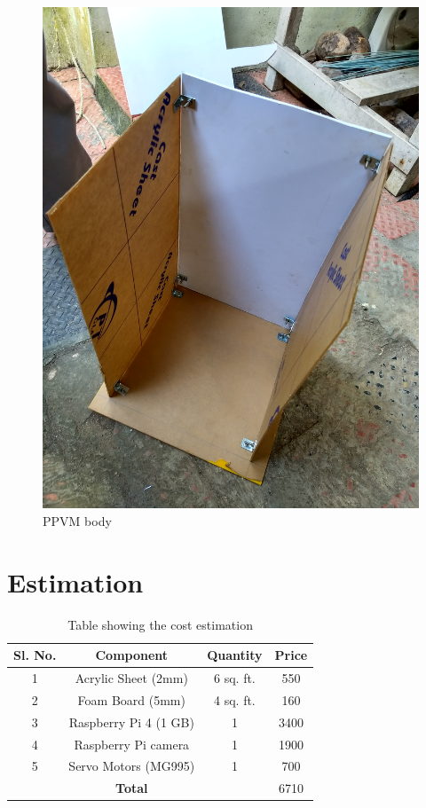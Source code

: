 \begin{figure}[H]
	\centering
	\includegraphics[width=0.7\linewidth]{./picture-files/ppvm_body.jpg}
	\caption{PPVM body}
	\label{fig:ppvm_body}
\end{figure}


\section{Estimation}

\begin{table}[H] \caption{Table showing the cost estimation}
	\centering
	\begin{tabular}{|c|c|c|c|}
		\hline 
		\textbf{ Sl. No.}&\textbf{Component}&\textbf{Quantity}	&\textbf{Price}\\ \hline
		1& Acrylic Sheet (2mm)	&	6 sq. ft.	&	550	\\ \hline
		2& Foam Board (5mm)	&	4 sq. ft.	&	160		\\ \hline
		3&Raspberry Pi 4 (1 GB)	&1	&3400		\\ \hline
		4&Raspberry Pi camera	&	1	&	1900		\\ \hline
		5&Servo Motors (MG995) 	&	1	&	700	\\ \hline

			&	\textbf{Total}	&		&	6710	\\ 
		\hline
	\end{tabular}
	
\end{table}


